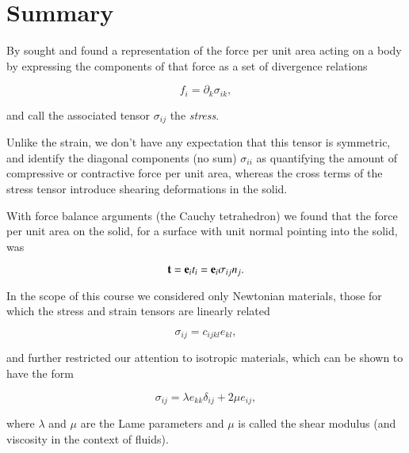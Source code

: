 \section{Summary}

By sought and found a representation of the force per unit area acting on a body by expressing the components of that force as a set of divergence relations

\begin{equation}\label{eqn:continuumElasticityReview:250}
f_i = \partial_k \sigma_{i k},
\end{equation}

and call the associated tensor $\sigma_{ij}$ the \textit{stress}.

Unlike the strain, we don't have any expectation that this tensor is symmetric, and identify the diagonal components (no sum) $\sigma_{i i}$ as quantifying the amount of compressive or contractive force per unit area, whereas the cross terms of the stress tensor introduce shearing deformations in the solid.

With force balance arguments (the Cauchy tetrahedron) we found that the force per unit area on the solid, for a surface with unit normal pointing into the solid, was

\begin{equation}\label{eqn:continuumElasticityReview:270}
\mathbf{t} = \mathbf{e}_i t_i = \mathbf{e}_i \sigma_{ij} n_j.
\end{equation}


In the scope of this course we considered only Newtonian materials, those for which the stress and strain tensors are linearly related

\begin{equation}\label{eqn:continuumElasticityReview:290}
\sigma_{ij} = c_{ijkl} e_{kl},
\end{equation}

and further restricted our attention to isotropic materials, which can be shown to have the form

\begin{equation}\label{eqn:continuumElasticityReview:310}
\sigma_{ij} = \lambda e_{kk} \delta_{ij} + 2 \mu e_{ij},
\end{equation}

where $\lambda$ and $\mu$ are the Lame parameters and $\mu$ is called the shear modulus (and viscosity in the context of fluids).

